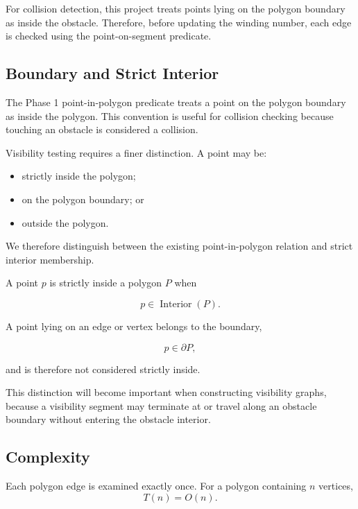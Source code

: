 For collision detection, this project treats points lying on the polygon
boundary as inside the obstacle. Therefore, before updating the winding
number, each edge is checked using the point-on-segment predicate.

\subsection{Boundary and Strict Interior}

The Phase 1 point-in-polygon predicate treats a point on the polygon
boundary as inside the polygon. This convention is useful for collision
checking because touching an obstacle is considered a collision.

Visibility testing requires a finer distinction. A point may be:

\begin{itemize}
    \item strictly inside the polygon;
    \item on the polygon boundary; or
    \item outside the polygon.
\end{itemize}

We therefore distinguish between the existing point-in-polygon relation and
strict interior membership.

A point $p$ is strictly inside a polygon $P$ when

\[
p \in \operatorname{Interior}(P).
\]

A point lying on an edge or vertex belongs to the boundary,

\[
p \in \partial P,
\]

and is therefore not considered strictly inside.

This distinction will become important when constructing visibility graphs,
because a visibility segment may terminate at or travel along an obstacle
boundary without entering the obstacle interior.

\subsection{Complexity}

Each polygon edge is examined exactly once. For a polygon containing $n$
vertices,
\[
T(n)=O(n).
\]
